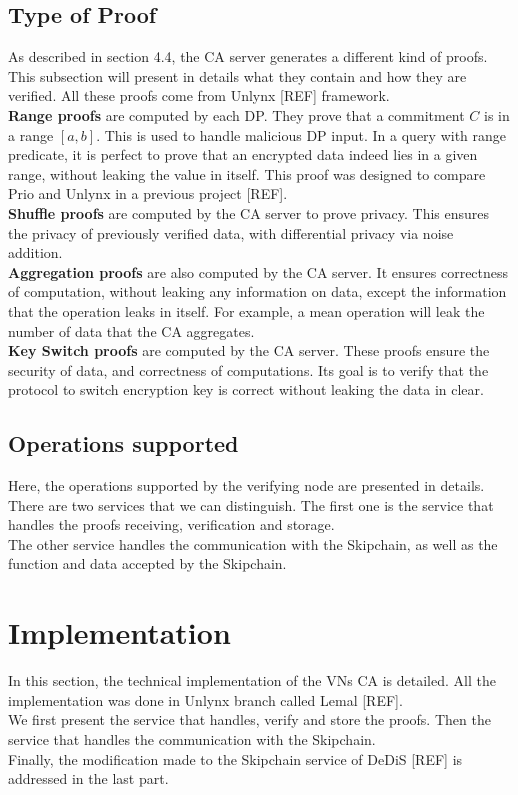 \documentclass{article}
\begin{document}
\subsection{Type of Proof}
As described in section 4.4, the CA server generates a different kind of proofs. This subsection will present in details what they contain and how they are verified. All these proofs come from Unlynx [REF] framework.\\
\textbf{Range proofs} are computed by each DP. They prove that a commitment $C$ is in a range $[a,b]$. This is used to handle malicious DP input. In a query with range predicate, it is perfect to prove that an encrypted data indeed lies in a given range, without leaking the value in itself. This proof was designed to compare Prio and Unlynx in a previous project [REF].\\
\textbf{Shuffle proofs} are computed by the CA server to prove privacy. This ensures the privacy of previously verified data, with differential privacy via noise addition.\\
\textbf{Aggregation proofs} are also computed by the CA server. It ensures correctness of computation, without leaking any information on data, except the information that the operation leaks in itself. For example, a mean operation will leak the number of data that the CA aggregates.\\
\textbf{Key Switch proofs} are computed by the CA server. These proofs ensure the security of data, and correctness of computations. Its goal is to verify that the protocol to switch encryption key is correct without leaking the data in clear.\\

\subsection{Operations supported}
Here, the operations supported by the verifying node are presented in details.\\
There are two services that we can distinguish. The first one is the service that handles the proofs receiving, verification and storage.\\
The other service handles the communication with the Skipchain, as well as the function and data accepted by the Skipchain.\\ 
\section{Implementation}
In this section, the technical implementation of the VNs CA is detailed. All the implementation was done in Unlynx branch called Lemal [REF].\\
We first present the service that handles, verify and store the proofs. Then the service that handles the communication with the Skipchain.\\
Finally, the modification made to the Skipchain service of DeDiS [REF] is addressed in the last part.
\end{document}
